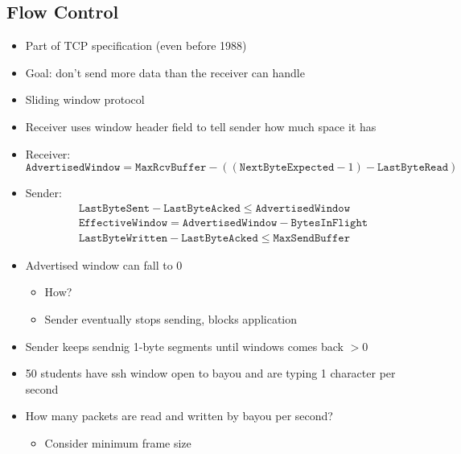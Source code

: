 \subsection{Flow Control}
\begin{itemize}
    \item Part of TCP specification (even before 1988)
    \item Goal: don't send more data than the receiver can handle
    \item Sliding window protocol
    \item Receiver uses window header field to tell sender how much space it has
    \item Receiver: \[\texttt{AdvertisedWindow} = \texttt{MaxRcvBuffer} - ((\texttt{NextByteExpected} - 1) - \texttt{LastByteRead})\]
    \item Sender:
          \begin{align*}
               & \texttt{LastByteSent} - \texttt{LastByteAcked}     \leq \texttt{AdvertisedWindow}                       \\
               & \texttt{EffectiveWindow}                           = \texttt{AdvertisedWindow} - \texttt{BytesInFlight} \\
               & \texttt{LastByteWritten} - \texttt{LastByteAcked}  \leq \texttt{MaxSendBuffer}
          \end{align*}
    \item Advertised window can fall to 0
          \begin{itemize}
              \item How?
              \item Sender eventually stops sending, blocks application
          \end{itemize}
    \item Sender keeps sendnig 1-byte segments until windows comes back $> 0$
    \item 50 students have ssh window open to bayou and are typing 1 character per second
    \item How many packets are read and written by bayou per second?
          \begin{itemize}
              \item Consider minimum frame size
          \end{itemize}
\end{itemize}
